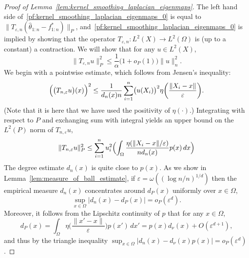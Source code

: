 \documentclass{article}
\newcommand{\1}{\mathbf{1}}
\newcommand{\wh}[1]{\widehat{#1}}
\theoremstyle{definition}
\theoremstyle{remark}
\begin{document}
\begin{proof}[Proof of Lemma~\ref{lem:kernel_smoothing_laplacian_eigenmaps}]
	The left hand side of~\eqref{pf:kernel_smoothing_laplacian_eigenmaps_0} is equal to $\|T_{\varepsilon,n}(\wh{\theta}_{1:n} - f^{\ast}_{1:n})\|_P$, and~\eqref{pf:kernel_smoothing_laplacian_eigenmaps_0} is implied by showing that the operator $T_{\varepsilon,n}: L^2(X) \to L^2(\Omega)$ is (up to a constant) a contraction. We will show that for any $u \in L^2(X)$,
	\begin{equation}
	\label{pf:kernel_smoothing_laplacian_eigenmaps_1}
	\|T_{\varepsilon,n}u\|_P^2 \leq \frac{1}{\alpha}\bigl(1 + o_P(1)\bigr) \|u\|_n^2.
	\end{equation}
	We begin with a pointwise estimate, which follows from Jensen's inequality:
	\begin{equation*}
	\Bigl(\bigl(T_{n,\varepsilon}u\bigr)(x)\Bigr)^2 \leq \frac{1}{d_n(x) n} \sum_{i = 1}^{n} \bigl(u(X_i)\bigr)^2 \eta\biggl(\frac{\|X_i - x\|}{\varepsilon}\biggr).
	\end{equation*}
	(Note that it is here that we have used the positivity of $\eta(\cdot)$.) Integrating with respect to $P$ and exchanging sum with integral yields an upper bound on the $L^2(P)$ norm of $T_{n,\varepsilon}u$,
	\begin{equation}
	\label{pf:kernel_smoothing_laplacian_eigenmaps_2}
	\|T_{n,\varepsilon}u\|_P^2 \leq \sum_{i = 1}^{n} u_i^2 \Bigl(\int_{\Omega} \frac{\eta(\|X_i - x\|/\varepsilon)}{n d_n(x)} p(x) \,dx \Bigr)
	\end{equation}
	The degree estimate $d_n(x)$ is quite close to $p(x)$. As we show in Lemma~\ref{lem:measure_of_ball_estimate}, if $\varepsilon = \omega((\log n/n)^{1/d})$ then the empirical measure $d_n(x)$ concentrates around $d_P(x)$ uniformly over $x \in \Omega$, 
	\begin{equation*}
	\sup_{x \in \Omega}|d_n(x) - d_P(x)| = o_P(\varepsilon^d).
	\end{equation*}
	Moreover, it follows from the Lipschitz continuity of $p$ that for any $x \in \Omega$,
	\begin{equation*}
	d_P(x) = \int_{\Omega} \eta\biggl(\frac{\|x' - x\|}{\varepsilon}\biggr) p(x') \,dx' = p(x) d_{\nu}(x) + O(\varepsilon^{d + 1}),
	\end{equation*}
	and thus by the triangle inequality $\sup_{x \in \Omega}|d_n(x) - d_\nu(x) p(x)| = o_P(\varepsilon^d)$.
	

\end{proof}
\end{document}
